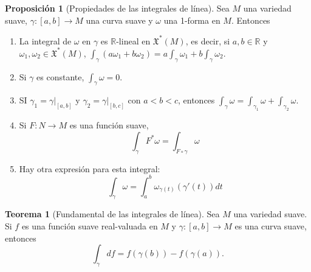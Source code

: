 \documentclass[spanish]{article}
\theoremstyle{definition}
\newtheorem*{teo}{Teorema}
\newtheorem*{prop}{Proposición}
\newcommand{\R}{\mathbb{R}}
\newcommand{\X}{\mathfrak{X}}
\begin{document}
	\begin{prop}[Propiedades de las integrales de línea]
		Sea $M$ una variedad suave, $\gamma:[a,b]\to M$ una curva suave y $\omega$ una 1-forma en $M$. Entonces
		\begin{enumerate}
			\item La integral de $\omega$ en $\gamma$ es $\R$-lineal en $\X^*(M)$, es decir, si $a,b\in\R$ y $\omega_1,\omega_2\in\X^*(M)$,
			$\int_\gamma(a\omega_1+b\omega_2)=a\int_\gamma\omega_1+b\int_\gamma\omega_2$.
			\item Si $\gamma$ es constante, $\int_\gamma\omega=0$.
			\item SI $\gamma_1=\gamma|_{[a,b]}$ y $\gamma_2=\gamma|_{[b,c]}$ con $a<b<c$, entonces
			$\int_\gamma\omega=\int_{\gamma_1}\omega+\int_{\gamma_2}\omega$.
			\item
			Si $F:N\to M$ es una función suave,
			\[\int_\gamma F^*\omega=\int_{F\circ \gamma}\omega\]
			\item Hay otra expresión para esta integral: \[\int_\gamma\omega=\int_a^b\omega_{\gamma(t)}(\gamma'(t))dt\]
		\end{enumerate}
	\end{prop}
	\begin{teo}[Fundamental de las integrales de línea]
		Sea $M$ una variedad suave. Si $f$ es una función suave real-valuada en $M$ y $\gamma:[a,b]\to M$ es una curva suave, entonces
		\[\int_\gamma df=f(\gamma(b))-f(\gamma(a)).\]
	\end{teo}
	
\end{document}

